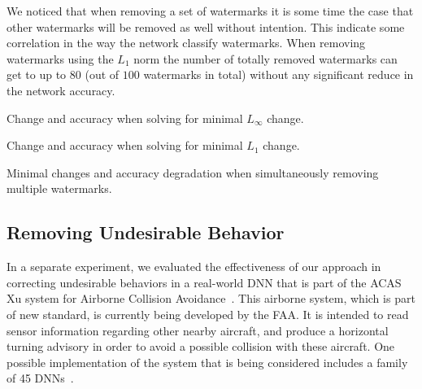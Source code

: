 \documentclass{easychair}
\begin{document}
We noticed that when removing a set of watermarks it is some time the case that other watermarks will be removed as well without intention. This indicate some correlation in the way the network classify watermarks. When removing watermarks using the $L_1$ norm the number of totally removed watermarks can get to up to $80$ (out of $100$ watermarks in total) without any significant reduce in the network accuracy.


\begin{table}
\begin{subtable}{1\textwidth}
\centering
{}
\caption{Change and accuracy when solving for minimal $L_\infty$ change.}
\end{subtable}
\begin{subtable}{1\textwidth}
\centering
{}
\caption{Change and accuracy when solving for minimal $L_1$ change.}
\end{subtable}
\caption{Minimal changes and accuracy degradation when simultaneously removing multiple watermarks.}
\label{table:multipleWatermarks}
\end{table}


\subsection{Removing Undesirable Behavior}

In a separate experiment, we evaluated the effectiveness of our
approach in correcting undesirable behaviors in a real-world DNN that
is part of the ACAS Xu system for Airborne Collision
Avoidance~\cite{JuLoBrOwKo16}. This airborne system, which is part of new
standard, is currently being developed by the FAA. It is intended to
read sensor information regarding other nearby aircraft, and produce a
horizontal turning advisory in order to avoid a possible collision
with these aircraft. One possible implementation of the system that is
being considered includes a family of 45 DNNs~\cite{JuLoBrOwKo16}.
\end{document}
